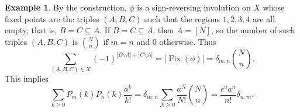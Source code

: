 \documentclass{amsart}
\numberwithin{equation}{section}
\theoremstyle{definition}
\newtheorem{exam}[thm]{Example}
\newcommand\Fix{\operatorname{Fix}}
\begin{document}
\begin{exam}
By the construction, \( \phi \) is a sign-reversing involution on
\( X \) whose fixed points are the triples \( (A,B,C) \) such that the
regions \( 1,2,3,4 \) are all empty, that is, \( B=C \subseteq A \).
If \( B=C \subseteq A \), then \( A = [N] \),
so the number of such triples \( (A,B,C) \) is
\( \binom{N}{n} \) if \( m=n \)
and \( 0 \) otherwise.
Thus
\[
  \sum_{(A,B,C)\in X} (-1)^{|B\setminus A| + |C\setminus A|} =
  |\Fix(\phi)| = \delta_{m,n} \binom{N}{n}.
\]
This implies
\[
  \sum_{k\ge 0}  P_m(k) P_n(k) \frac{a^k}{k!}
  = \delta_{m,n} \sum_{N\ge0} \frac{a^N}{N!} \binom{N}{n}
  = \frac{e^a a^n}{n!} \delta_{n,m}.
\]
\end{exam}











\end{document}
